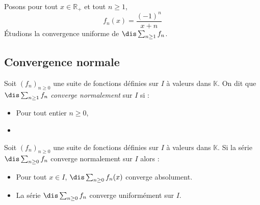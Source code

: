 \documentclass[a4paper,10pt]{report}
\begin{document}
\begin{ex} Posons pour tout $x \in \mathbb{R}_+$ et tout $n \geq 1$, 
$$ f_n(x) = \frac{(-1)^n}{x+n}$$
Étudions la convergence uniforme de $\dis \sum_{n \geq 1} f_n$.

%
%
%
%
%
%

\vspace{10.2cm}
\end{ex}

\subsection{Convergence normale}

\begin{defin} Soit $(f_n)_{n \geq 0}$ une suite de fonctions définies sur $I$ à valeurs dans $\mathbb{K}$. On dit que $\dis \sum_{n \geq 1} f_n$ \textit{converge normalement} sur $I$ si :

\begin{itemize}
\item Pour tout entier $n \geq 0$, \phantom{$f_n$ est bornée sur $I$.}
\item {}
\end{itemize}
\end{defin}

\begin{thm} Soit $(f_n)_{n \geq 0}$ une suite de fonctions définies sur $I$ à valeurs dans $\mathbb{K}$. Si la série $\dis \sum_{n \geq 0} f_n$ converge normalement sur $I$ alors :

\begin{itemize}
\item Pour tout $x \in I$, $\dis \sum_{n \geq 0} f_n(x)$ converge absolument.
\item La série $\dis \sum_{n \geq 0} f_n$ converge uniformément sur $I$.
\end{itemize}
\end{thm}
\end{document}
